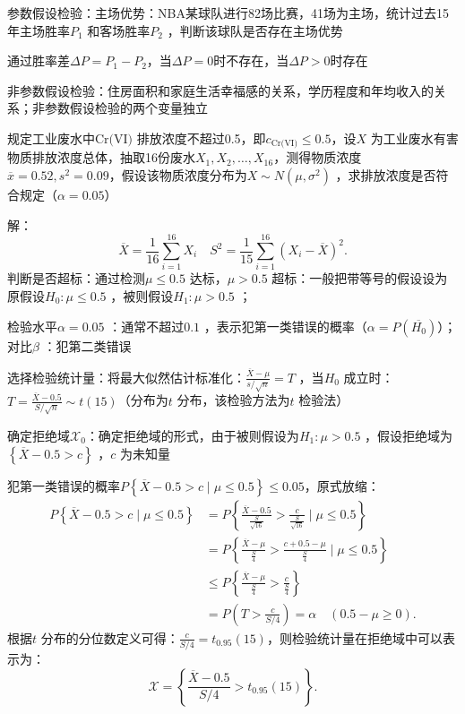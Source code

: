 \begin{eg}
    参数假设检验：主场优势：NBA某球队进行82场比赛，41场为主场，统计过去15年主场胜率$P_1$ 和客场胜率$P_2$ ，判断该球队是否存在主场优势
\end{eg}
通过胜率差$\Delta P=P_1-P_2$，当$\Delta P=0$时不存在，当$\Delta P>0$时存在
\begin{notation}
    非参数假设检验：住房面积和家庭生活幸福感的关系，学历程度和年均收入的关系；非参数假设检验的两个变量独立
\end{notation}
\begin{eg}
    规定工业废水中$\text{Cr(VI)}$ 排放浓度不超过0.5，即$c_\text{Cr(VI)}\le 0.5$，设$X$ 为工业废水有害物质排放浓度总体，抽取16份废水$X_1,X_2,\ldots ,X_{16}$，测得物质浓度$\overline{x}=0.52,s^2 =0.09$，假设该物质浓度分布为$X\sim N\left( \mu,\sigma^2  \right)$ ，求排放浓度是否符合规定（$\alpha=0.05$）
\end{eg}
解：\[
    \overline{X}=\frac{1}{16}\sum_{i=1}^{16} X_{i}\quad S^2 =\frac{1}{15}\sum_{i=1}^{16} \left( X_{i}-\overline{X} \right)^2 
.\]
判断是否超标：通过检测$\mu\le 0.5$ 达标，$\mu>0.5$ 超标：一般把带等号的假设设为原假设$H_0:\mu\le 0.5$ ，被则假设$H_1:\mu>0.5$ ；

检验水平$\alpha=0.05$ ：通常不超过$0.1$ ，表示犯第一类错误的概率（$\alpha=P\left( \overline{H_0} \right)$）；对比$\beta$ ：犯第二类错误

选择检验统计量：将最大似然估计标准化：$\frac{\overline{X}-\mu}{s /\sqrt{n}}=T$ ，当$H_0$ 成立时：$T=\frac{\overline{X}-0.5}{S /\sqrt{n}}\sim t\left( 15 \right)$（分布为$t$ 分布，该检验方法为$t$ 检验法）

确定拒绝域$\mathscr{X}_0$：确定拒绝域的形式，由于被则假设为$H_1:\mu>0.5$ ，假设拒绝域为$\left\{ \overline{X}-0.5>c \right\}$ ，$c$ 为未知量

犯第一类错误的概率$P\left\{ \overline{X}-0.5>c \mid \mu\le 0.5 \right\}\le 0.05$，原式放缩：
\begin{align*}
    P\left\{ \overline{X}-0.5>c \mid \mu\le 0.5 \right\}&= P\left\{ \frac{\overline{X}-0.5}{\frac{S}{\sqrt{16}}}>\frac{c}{\frac{S}{\sqrt{16}}} \mid \mu\le 0.5\right\} \\
    &= P\left\{ \frac{\overline{X}-\mu}{\frac{S}{4}}>\frac{c+0.5-\mu}{\frac{S}{4}}\mid \mu\le 0.5 \right\} \\
    &\le P\left\{ \frac{\overline{X}-\mu}{\frac{S}{4}}>\frac{c}{\frac{S}{4}} \right\}\\
    &= P\left( T>\frac{c}{S /4} \right) =\alpha \quad \left( 0.5-\mu\ge 0 \right)
.\end{align*}
根据$t$ 分布的分位数定义可得：$\frac{c}{S /4}=t_{0.95}\left( 15 \right)$，则检验统计量在拒绝域中可以表示为：\[
    \mathscr{X}=\left\{ \frac{\overline{X}-0.5}{S /4}>t_{0.95}\left( 15 \right) \right\}
.\]

